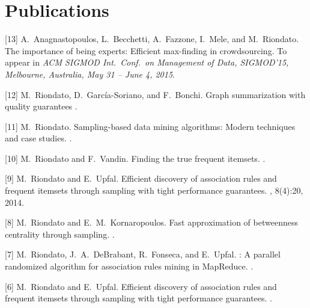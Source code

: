 \documentclass[margin,line]{resume}
\begin{document}
\section{\sc Publications}

[13] A.~Anagnastopoulos, L.~Becchetti, A.~Fazzone, I.~Mele, and M.~Riondato.
\newblock The importance of being experts: Efficient max-finding in
crowdsourcing.
\newblock To appear in {\em ACM SIGMOD Int.~Conf.~on Management of Data,
SIGMOD'15, Melbourne, Australia, May 31 -- June 4, 2015}.

[12] M.~Riondato, D.~Garc\'ia-Soriano, and F.~Bonchi.
\newblock Graph summarization with quality guarantees
.

[11] M.~Riondato.
\newblock Sampling-based data mining algorithms: Modern techniques and case
  studies.
.

[10] M.~Riondato and F.~Vandin.
\newblock Finding the true frequent itemsets.
.

[9] M.~Riondato and E.~Upfal.
\newblock Efficient discovery of association rules and frequent itemsets through
sampling with tight performance guarantees.
, 8(4):20, 2014.

[8] M.~Riondato and E.~M.~Kornaropoulos.
\newblock Fast approximation of betweenness centrality through sampling.
.

[7] M.~Riondato, J.~A.~DeBrabant, R.~Fonseca, and E.~Upfal.
: A parallel randomized algorithm for association rules mining
  in {MapReduce}.
.

[6] M.~Riondato and E.~Upfal.
\newblock Efficient discovery of association rules and frequent itemsets
  through sampling with tight performance guarantees.
.
\end{document}
